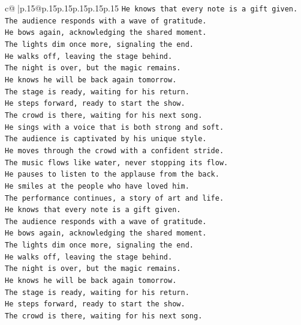 \documentclass{article}
\begin{document}
{\begin{supertabular}{c@{$\;$}|p{.15\linewidth}@{}p{.15\linewidth}p{.15\linewidth}p{.15\linewidth}p{.15\linewidth}p{.15\linewidth}}
{{{\texttt{He knows that every note is a gift given.} \\
\texttt{The audience responds with a wave of gratitude.} \\
\texttt{He bows again, acknowledging the shared moment.} \\
\texttt{The lights dim once more, signaling the end.} \\
\texttt{He walks off, leaving the stage behind.} \\
\texttt{The night is over, but the magic remains.} \\
\texttt{He knows he will be back again tomorrow.} \\
\texttt{The stage is ready, waiting for his return.} \\
\texttt{He steps forward, ready to start the show.} \\
\texttt{The crowd is there, waiting for his next song.} \\
\texttt{He sings with a voice that is both strong and soft.} \\
\texttt{The audience is captivated by his unique style.} \\
\texttt{He moves through the crowd with a confident stride.} \\
\texttt{The music flows like water, never stopping its flow.} \\
\texttt{He pauses to listen to the applause from the back.} \\
\texttt{He smiles at the people who have loved him.} \\
\texttt{The performance continues, a story of art and life.} \\
\texttt{He knows that every note is a gift given.} \\
\texttt{The audience responds with a wave of gratitude.} \\
\texttt{He bows again, acknowledging the shared moment.} \\
\texttt{The lights dim once more, signaling the end.} \\
\texttt{He walks off, leaving the stage behind.} \\
\texttt{The night is over, but the magic remains.} \\
\texttt{He knows he will be back again tomorrow.} \\
\texttt{The stage is ready, waiting for his return.} \\
\texttt{He steps forward, ready to start the show.} \\
\texttt{The crowd is there, waiting for his next song.} \\
}}}
\end{supertabular}}
\end{document}
